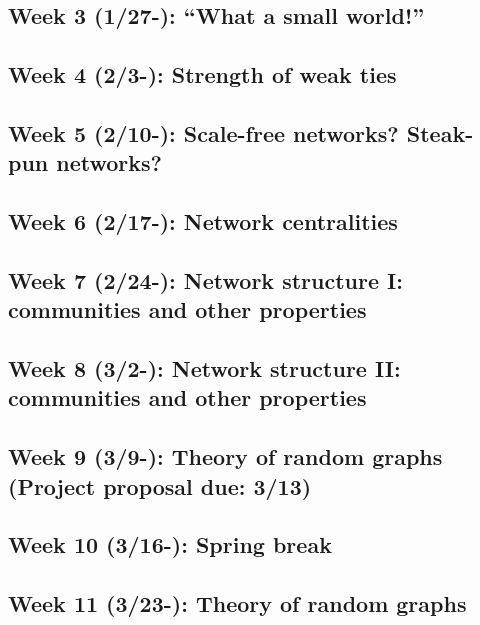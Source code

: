 \documentclass[11pt,article,oneside]{memoir} %
\begin{document}
\subsection{Week 3 (1/27-):  ``What a small world!''}%
\subsection{Week 4 (2/3-):  Strength of weak ties}
\subsection{Week 5 (2/10-):  Scale-free networks? Steak-pun networks?}
\subsection{Week 6 (2/17-):  Network centralities}
\subsection{Week 7 (2/24-):  Network structure I: communities and other properties}
\subsection{Week 8 (3/2-):  Network structure II: communities and other properties}
\subsection{Week 9 (3/9-):  Theory of random graphs (Project proposal due: 3/13)}
\subsection{\color{gray}Week 10 (3/16-): Spring break}
\subsection{Week 11 (3/23-): Theory of random graphs}
\end{document}

